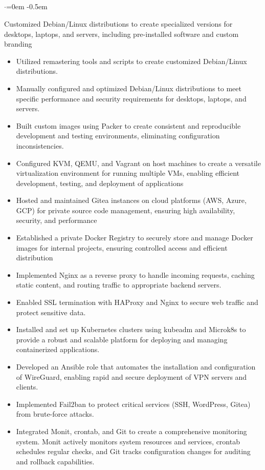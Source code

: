 \documentclass{article}
\begin{document}
\subsection*{}
\vspace{-2.6em}
\begin{list}{$\cdot$}{\leftmargin=0em} %
    \itemsep -0.5em \vspace{-0.5em} %
    \item Customized Debian/Linux distributions to create specialized versions for desktops, laptops, and servers, including pre-installed software  and custom branding
\end{list}
\vspace{-1.6em}
\begin{itemize}
    \item Utilized remastering tools and scripts to create customized Debian/Linux distributions.
    \item Manually configured and optimized Debian/Linux distributions to meet specific performance and security requirements for desktops, laptops, and servers.
    \item Built custom images using Packer to create consistent and reproducible development and testing environments, eliminating configuration inconsistencies.
    \item Configured KVM, QEMU, and Vagrant on host machines to create a versatile virtualization environment for running multiple VMs, enabling efficient development, testing, and deployment of applications
    \item Hosted and maintained Gitea instances on cloud platforms (AWS, Azure, GCP) for private source code management, ensuring high availability, security, and performance
    \item Established a private Docker Registry to securely store and manage Docker images for internal projects, ensuring controlled access and efficient distribution
    \item Implemented Nginx as a reverse proxy to handle incoming requests, caching static content, and routing traffic to appropriate backend servers.
    \item Enabled SSL termination with HAProxy and Nginx to secure web traffic and protect sensitive data.
    \item Installed and set up Kubernetes clusters using kubeadm and Microk8s to provide a robust and scalable platform for deploying and managing containerized applications.
    \item Developed an Ansible role that automates the installation and configuration of WireGuard, enabling rapid and secure deployment of VPN servers and clients.
    \item Implemented Fail2ban to protect critical services (SSH, WordPress, Gitea) from brute-force attacks.
    \item Integrated Monit, crontab, and Git to create a comprehensive monitoring system. Monit actively monitors system resources and services, crontab schedules regular checks, and Git tracks configuration changes for auditing and rollback capabilities.
\end{itemize}
\end{document}
